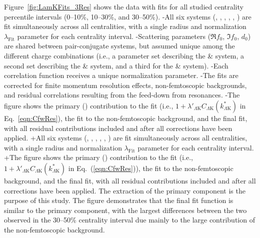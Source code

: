 \begin{table}[htbp]
 Figure~\ref{fig:LamKFits_3Res} shows the \LamK data with fits for all studied centrality percentile intervals (0--10\%, 10--30\%, and 30--50\%). 
-All six \LamK systems (\LamKchP, \ALamKchM, \LamKchM, \ALamKchP, \LamKs, \ALamKs) are fit simultaneously across all centralities, with a single radius and normalization $\lambda_{\mathrm{Fit}}$ parameter for each centrality interval.
-Scattering parameters ($\Re f_{0}$, $\Im f_{0}$, $d_{0}$) are shared between pair-conjugate systems, but assumed unique among the different \LamK charge combinations (i.e., a parameter set describing the \LamKchP \& \ALamKchM system, a second set describing the \LamKchM \& \ALamKchP system, and a third for the \LamKs \& \ALamKs system).
-Each correlation function receives a unique normalization parameter.
-The fits are corrected for finite momentum resolution effects, non-femtoscopic backgrounds, and residual correlations resulting from the feed-down from resonances.  
-The figure shows the primary (\LamK) contribution to the fit (i.e., $1 + \lambda'_{\Lambda\mathrm{K}}C_{\Lambda\mathrm{K}}(k^{*}_{\Lambda\mathrm{K}})$ in Eq.~\ref{eqn:CfwRes}), the fit to the non-femtoscopic background, and the final fit, with all residual contributions included and after all corrections have been applied.
+All six \LamK systems (\LamKchP, \ALamKchM, \LamKchM, \ALamKchP, \LamKs, \ALamKs) are fit simultaneously across all centralities, with a single radius and normalization $\lambda_{\mathrm{Fit}}$ parameter for each centrality interval. 
+The figure shows the primary (\LamK) contribution to the fit (i.e., $1 + \lambda'_{\Lambda\mathrm{K}}C_{\Lambda\mathrm{K}}(k^{*}_{\Lambda\mathrm{K}})$ in Eq.~(\ref{eqn:CfwRes})), the fit to the non-femtoscopic background, and the final fit, with all residual contributions included and after all corrections have been applied.
 The extraction of the primary \LamK component is the purpose of this study.
 The figure demonstrates that the final fit function is similar to the primary \LamK component, with the largest differences between the two observed in the 30--50\% centrality interval due mainly to the large contribution of the non-femtoscopic background.
 

\end{table}
